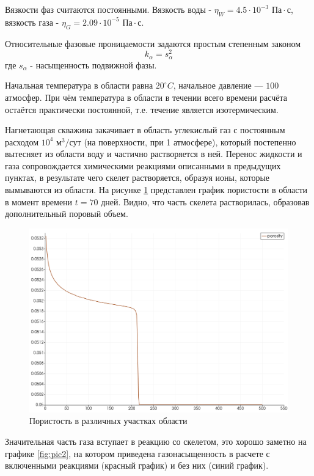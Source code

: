\documentclass[14pt,a4paper]{extarticle}
\begin{document}
Вязкости фаз считаются постоянными. Вязкость воды - ${\eta}_W = 4.5 \cdot 10^{-3} \text{ Па} \cdot \text{с}$, вязкость газа - $\eta_G = 2.09\cdot 10^{-5} \text{ Па} \cdot \text{с}$.

Относительные фазовые проницаемости задаются простым степенным законом $$k_{\alpha} = s_{\alpha}^2$$ где $s_{\alpha}$ - насыщенность подвижной фазы.

Начальная температура в области равна $20^\circ C$, начальное давление --- $100$ атмосфер. При чём температура в области в течении всего времени расчёта остаётся практически постоянной, т.е. течение является изотермическим.

Нагнетающая скважина закачивает в область углекислый газ с постоянным расходом $10^4 \text{ м}^3/\text{сут}$ (на поверхности, при 1 атмосфере), который постепенно вытесняет из области воду и частично растворяется в ней. Перенос жидкости и газа сопровождается химическими реакциями описанными в предыдущих пунктах, в результате чего скелет растворяется, образуя ионы, которые вымываются из области. На рисунке \ref{fig:pic1} представлен график пористости в области в момент времени $t = 70\text{ дней}$. Видно, что часть скелета растворилась, образовав дополнительный поровый объем.

\begin{figure}[h!]
\centering
\includegraphics[width=.8\textwidth]{porosity}
\caption{Пористость в различных участках области} \label{fig:pic1}
\end{figure}

Значительная часть газа вступает в реакцию со скелетом, это хорошо заметно на графике \ref{fig:pic2}, на котором приведена газонасыщенность в расчете с включенными реакциями (красный график) и без них (синий график).
\end{document}

